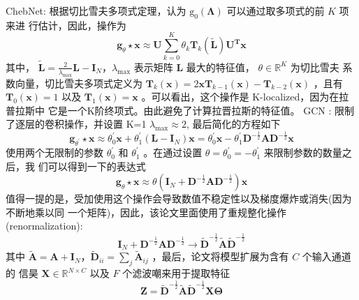 \documentclass[a4paper,UTF8]{article}
\numberwithin{equation}{section}
\renewcommand{\tilde}{\widetilde}
\begin{document}
{		ChebNet: \citep{journal/JieZhou2020}根据切比雪夫多项式定理，认为 $\mathrm{g}_{0}(\boldsymbol{\Lambda})$ 可以通过取多项式的前 $K$ 项来进 行估计，因此，操作为
		$$
		\mathbf{g}_{\theta} \star \mathbf{x} \approx \mathbf{U} \sum_{k=0}^{K} \theta_{k} \mathbf{T}_{k}(\tilde{\mathbf{L}}) \mathbf{U}^{\mathbf{T}} \mathbf{x}
		$$
		其中， $\tilde{\mathbf{L}}=\frac{2}{\lambda_{\max }} \mathbf{L}-\mathbf{I}_{N} ， \lambda_{\max }$ 表示矩阵 $\mathbf{L}$ 最大的特征值， $\theta \in \mathbb{R}^{K}$ 为切比雪夫 系数向量，切比雪夫多项式定义为 $\mathbf{T}_{k}(\mathbf{x})=2 \mathbf{x} \mathbf{T}_{k-1}(\mathbf{x})-\mathbf{T}_{k-2}(\mathbf{x})$ ，且有 $\mathbf{T}_{0}(\mathbf{x})=1$ 以及 $\mathbf{T}_{1}(\mathbf{x})=\mathbf{x}$ 。可以看出，这个操作是 K-localized，因为在拉普拉斯中 它是一个K阶终项式。由此避免了计算拉晋拉斯的特征值。
		GCN : \citep{conf/Thomas2017}限制了逐层的卷积操作，并设置  K=1 
		$\lambda_{\max } \approx 2$, 最后简化的方程如下
		$$
		\mathbf{g}_{\theta^{\prime}} \star \mathbf{x} \approx \theta_{0}^{\prime} \mathbf{x}+\theta_{1}^{\prime}\left(\mathbf{L}-\mathbf{I}_{N}\right) \mathbf{x}=\theta_{0}^{\prime} \mathbf{x}-\theta_{1}^{\prime} \mathbf{D}^{-\frac{1}{2}} \mathbf{A} \mathbf{D}^{-\frac{1}{2}} \mathbf{x}
		$$
		使用两个无限制的参数 $\theta_{0}^{\prime}$ 和 $\theta_{1}^{\prime}$ 。在通过设置 $\theta=\theta_{0}^{\prime}=-\theta_{1}^{\prime}$ 来限制参数的数量之后，我 们可以得到一下的表达式
		$$
		\mathbf{g}_{\theta} \star \mathbf{x} \approx \theta\left(\mathbf{I}_{N}+\mathbf{D}^{-\frac{1}{2}} \mathbf{A} \mathbf{D}^{-\frac{1}{2}}\right) \mathbf{x}
		$$
		值得一提的是，受加使用这个操作会导致数值不稳定性以及梯度爆炸或消失(因为不断地乘以同 一个矩阵)，因此，该论文里面使用了重规整化操作(renormalization):
		$$
		\mathbf{I}_{N}+\mathbf{D}^{-\frac{1}{2}} \mathbf{A D}^{-\frac{1}{2}} \rightarrow \tilde{\mathbf{D}}^{-\frac{1}{2}} \tilde{\mathbf{A}} \tilde{\mathbf{D}}^{-\frac{1}{2}}
		$$
		其中 $\tilde{\mathbf{A}}=\mathbf{A}+\mathbf{I}_{N} ， \tilde{\mathbf{D}}_{i i}=\sum_{j} \tilde{\mathbf{A}}_{i j}$ ，最后，论文将模型扩展为含有 $C$ 个输入通道的 信昊 $\mathbf{X} \in \mathbb{R}^{N \times C}$ 以及 $F$ 个滤波嘲来用于提取特征
		$$
		\mathbf{Z}=\tilde{\mathbf{D}}^{-\frac{1}{2}} \tilde{\mathbf{A}} \tilde{\mathbf{D}}^{-\frac{1}{2}} \mathbf{X} \boldsymbol{\Theta}
		$$
		
}
\end{document}
